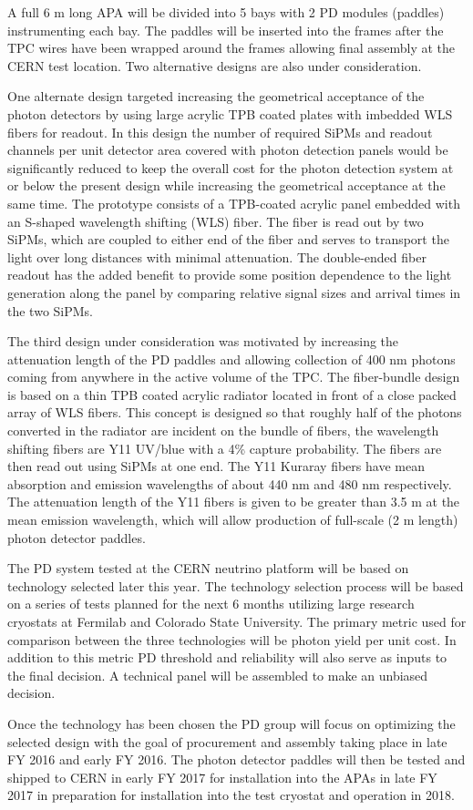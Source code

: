 A full 6 m long APA will be divided into 5 bays with 2 PD modules (paddles) instrumenting each bay. The paddles will be inserted into the frames after the TPC wires have been wrapped around the frames allowing  final assembly at the CERN test location. Two alternative designs are also under consideration. 


One alternate design targeted increasing the geometrical acceptance of the photon detectors by using large acrylic TPB coated plates with imbedded WLS fibers for readout. In this design the number of required SiPMs and readout channels per unit detector area covered with photon detection panels would be significantly reduced to keep the overall cost for the photon detection system at or below the present design while increasing the geometrical acceptance at the same time. The prototype consists of a TPB-coated acrylic panel embedded with an S-shaped wavelength shifting (WLS) fiber. The fiber is read out by two SiPMs, which are coupled to either end of the fiber and serves to transport the light over long distances with minimal attenuation. The double-ended fiber readout has the added benefit to provide some position dependence to the light generation along the panel by comparing relative signal sizes and arrival times in the two SiPMs. 



The third design under consideration was motivated by increasing the attenuation length of the PD paddles and allowing collection of 400 nm photons coming from anywhere in the active volume of the TPC.  The fiber-bundle design is based on a thin TPB coated acrylic radiator located in front of a close packed array of WLS fibers. This concept is designed so that roughly half of the photons converted in the radiator are incident on the bundle of fibers, the wavelength shifting fibers are Y11 UV/blue with a 4\% capture probability. The fibers are then read out using SiPMs at one end. The Y11  Kuraray fibers have mean absorption and emission wavelengths of about 440 nm and 480 nm respectively.  The attenuation length of the Y11 fibers is given to be greater than 3.5 m at the mean emission wavelength, which will allow production of full-scale (2 m length) photon detector paddles.


The PD system tested at the CERN neutrino platform will be based on technology selected later this year. The technology selection process will be based on a series of tests planned for the next 6 months utilizing large research cryostats at Fermilab and Colorado State University. The primary metric used for comparison between the three technologies will be photon yield per unit cost. In addition to this metric PD threshold and reliability will also serve as inputs to the final decision. A technical panel will be assembled to make an unbiased decision. 

Once the technology has been chosen the PD group will focus on optimizing the selected design with the goal of procurement and assembly taking place in late FY 2016 and early FY 2016. The photon detector paddles will then be tested and shipped to CERN in early FY 2017 for installation into the APAs in late FY 2017 in preparation for installation into the test cryostat and operation in 2018. 
